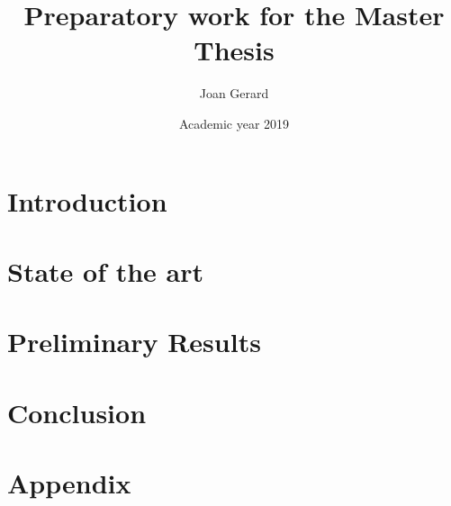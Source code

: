 \documentclass[12pt,twoside]{report}
\title{Preparatory work for the Master Thesis}
\author{Joan Gerard}
\date{Academic year 2019}
\begin{document}


%

\tableofcontents

\listoffigures

\listoftables

\chapter{Introduction}


\chapter{State of the art}


\chapter{Preliminary Results}


%

\chapter*{Conclusion}


\appendix
\chapter{Appendix}


\printbibliography
\end{document}
